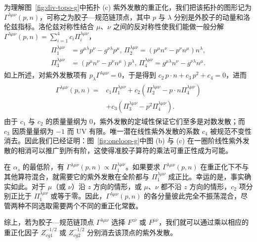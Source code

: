 为理解图~\ref{fig:div-topo-g}中拓扑 (c) 紫外发散的重正化，我们把该拓扑的图形记为 $\Gamma^{\lambda \mu \nu}(p,n)$，可称之为胶子—规范链顶点，其中 $p$ 与 $\lambda$ 分别是外胶子的动量和洛伦兹指标。洛伦兹对称性结合 $\mu$、$\nu$ 之间的反对称性使我们能做一般分解 $\Gamma^{\lambda \mu \nu}(p,n)=\sum_{i=1}^4 c_i \Pi_i^{\lambda \mu \nu}$，
\begin{align}
\begin{split}
\Pi_1^{\lambda \mu \nu}&=g^{\mu\lambda} p^\nu-g^{\nu\lambda}p^\mu,\, \Pi_2^{\lambda \mu \nu}=(p^\mu n^\nu-p^\nu n^\mu)n^\lambda,\\
\Pi_3^{\lambda \mu \nu}&=(p^\mu n^\nu-p^\nu n^\mu)p^\lambda, \,\Pi_4^{\lambda \mu \nu}=g^{\mu\lambda} n^\nu-g^{\nu\lambda}n^\mu.
\end{split}
\end{align}
如上所述，对紫外发散项有 $p_\lambda \Gamma^{\lambda \mu \nu}=0$，于是得到 $c_2\, p\cdot n + c_3\, p^2 + c_4=0$，进而
\begin{align}
\begin{split}
\Gamma^{\lambda \mu \nu}(p,n)=&c_1 \Pi_1^{\lambda \mu \nu} + c_2 (\Pi_2^{\lambda \mu \nu}-p\cdot n \Pi_4^{\lambda \mu \nu})\\
&+c_3 (\Pi_3^{\lambda \mu \nu}-p^2 \Pi_4^{\lambda \mu \nu}).
\end{split}
\end{align}
由于 $c_1$ 与 $c_2$ 的质量量纲为 $0$，紫外发散的定域性保证它们至多是对数发散；而 $c_3$ 因质量量纲为 $-1$ 而 UV 有限。唯一潜在线性紫外发散的系数 $c_4$ 被规范不变性消去。因此我们已经证明：图~\ref{fig:oneloop-g}中图 (b) 与 (c) 在一圈阶线性紫外发散的相消可以推广到所有阶，这使得准胶子算符的乘法可重正性成为可能。

在 $\alpha_s$ 的最低阶，有 $\Gamma^{\lambda \mu \nu}(p,n) \propto \Pi_1^{\lambda \mu \nu}$。如果要求 $\Gamma^{\lambda \mu \nu}(p,n)$ 在重正化下不与其他算符混合，就需要它的紫外发散在全阶都与 $\Pi_1^{\lambda \mu \nu}$ 成正比。幸运的是，事实确实如此。对于 $\mu$（或 $\nu$）沿 $z$ 方向的情形，或 $\mu$、$\nu$ 都不沿 $z$ 方向的情形，$c_2$ 项分别正比于 $\Pi_1^{\lambda \mu \nu}$ 或等于零。因此，$\Gamma^{\lambda \mu \nu}(p,n)$ 的各分量彼此完全不振荡混合，尽管两种不同选取需要两个不同的重正化常数。

综上，若为胶子—规范链顶点 $\Gamma^{\lambda \mu \nu}$ 选择 $F^{z \bar{\nu}}$ 或 $F^{\bar{\mu} \bar{\nu}}$，我们就可以通过乘以相应的重正化因子 $Z_{vg1}^{-1/2}$ 或 $Z_{vg2}^{-1/2}$ 分别消去该顶点的紫外发散。
